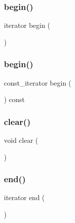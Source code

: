 \subsubsection{\texorpdfstring{begin()}{begin()}\hspace{0.1cm}{\footnotesize\ttfamily [1/2]}}
{\footnotesize\ttfamily iterator begin (\begin{DoxyParamCaption}{ }\end{DoxyParamCaption})\hspace{0.3cm}{\ttfamily [inline]}}

\mbox{\label{classStack_a29305669b60ca1680752e2fc3592ba99}} 
\subsubsection{\texorpdfstring{begin()}{begin()}\hspace{0.1cm}{\footnotesize\ttfamily [2/2]}}
{\footnotesize\ttfamily const\+\_\+iterator begin (\begin{DoxyParamCaption}{ }\end{DoxyParamCaption}) const\hspace{0.3cm}{\ttfamily [inline]}}

\mbox{\label{classStack_ac8bb3912a3ce86b15842e79d0b421204}} 
\subsubsection{\texorpdfstring{clear()}{clear()}}
{\footnotesize\ttfamily void clear (\begin{DoxyParamCaption}{ }\end{DoxyParamCaption})}

\mbox{\label{classStack_acad38d52497a975bfb6f2f6acd76631f}} 
\subsubsection{\texorpdfstring{end()}{end()}\hspace{0.1cm}{\footnotesize\ttfamily [1/2]}}
{\footnotesize\ttfamily iterator end (\begin{DoxyParamCaption}{ }\end{DoxyParamCaption})\hspace{0.3cm}{\ttfamily [inline]}}

